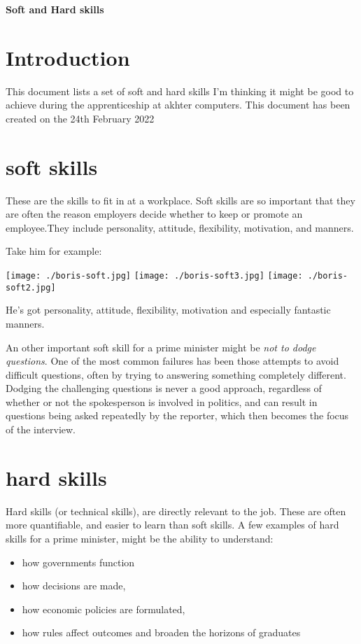 \documentclass[a4paper,12pt]{article}
\begin{document}
\textbf{Soft and Hard skills}


\tableofcontents
\clearpage

 
\section{Introduction}
This document lists a set of soft and hard skills I'm thinking it might be good to achieve during the apprenticeship at akhter computers. This document has been created on the 24th February 2022

\section{soft skills}
These are the skills to fit in at a workplace. Soft skills are so important that they are often the reason employers decide whether to keep or promote an employee.They include personality, attitude, flexibility, motivation, and manners.

Take him for example:

\texttt{[image: ./boris-soft.jpg]}
\texttt{[image: ./boris-soft3.jpg]}
\texttt{[image: ./boris-soft2.jpg]}

He's got personality, attitude, flexibility, motivation and especially fantastic manners.

An other important soft skill for a prime minister might be \emph{not to dodge questions}.
One of the most common failures has been those attempts to avoid difficult questions, often by trying to answering something completely different.
Dodging the challenging questions is never a good approach, regardless of whether or not the spokesperson is involved in politics, and can result in questions being asked repeatedly by the reporter, which then becomes the focus of the interview.

\clearpage

\section{hard skills}
Hard skills (or technical skills), are directly relevant to the job. These are often more quantifiable, and easier to learn than soft skills.
A few examples of hard skills for a prime minister, might be the ability to understand:

\begin{itemize}

\item  how governments function 
\item  how decisions are made,
\item  how economic policies are formulated,
\item  how rules affect outcomes and broaden the horizons of graduates

\end{itemize}
\end{document}
